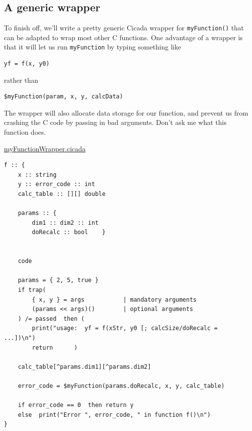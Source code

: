 \documentclass{article}
\newenvironment{code}{
       \begin{list}{}{
               \setlength{\leftmargin}{.4in}
               \setlength{\rightmargin}{0in}
               \setlength{\topsep}{.2in}
       }
       \small
       \item[] }
       { \end{list}   }
\begin{document}
\subsection{A generic wrapper}

To finish off, we'll write a pretty generic Cicada wrapper for \verb#myFunction()# that can be adapted to wrap most other C functions.  One advantage of a wrapper is that it will let us run \verb#myFunction# by typing something like

\begin{code} \begin{verbatim}
yf = f(x, y0)
\end{verbatim} \end{code}

\noindent rather than

\begin{code} \begin{verbatim}
$myFunction(param, x, y, calcData)
\end{verbatim} \end{code}

\noindent The wrapper will also allocate data storage for our function, and prevent us from crashing the C code by passing in bad arguments.  Don't ask me what this function does.\\\vspace{.2in}

\noindent \underline{myFunctionWrapper.cicada}

\begin{code} \begin{verbatim}
f :: {
    x :: string
    y :: error_code :: int
    calc_table :: [][] double
    
    params :: {
        dim1 :: dim2 :: int
        doRecalc :: bool    }
    
    
    code
    
    params = { 2, 5, true }
    if trap(
        { x, y } = args           | mandatory arguments
        (params << args)()        | optional arguments
    ) /= passed  then (
        print("usage:  yf = f(xStr, y0 [; calcSize/doRecalc = ...])\n")
        return      )
    
    calc_table[^params.dim1][^params.dim2]
    
    error_code = $myFunction(params.doRecalc, x, y, calc_table)
    
    if error_code == 0  then return y
    else  print("Error ", error_code, " in function f()\n")
}
\end{verbatim} \end{code}
\end{document}
